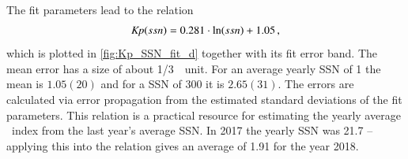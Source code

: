 The fit parameters lead to the relation
\begin{align}
	\textit{Kp}(ssn) = 0.281 \cdot \ln(ssn) + 1.05	\,,	\label{eq:kp_ssn_relation}
\end{align}
which is plotted in \autoref{fig:Kp_SSN_fit_d} together with its fit error band. The mean error has a size of about 1/3~\Kp~unit. For an average yearly SSN of 1 the mean \Kp{} is $1.05(20)$ and for a SSN of 300 it is $2.65(31)$. The errors are calculated via error propagation from the estimated standard deviations of the fit parameters.
This relation is a practical resource for estimating the yearly average \Kp~index from the last year's average SSN. In 2017 the yearly SSN was \num{21.7} -- applying this into the relation gives an average \Kp{} of \num{1.91} for the year 2018.

